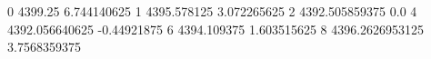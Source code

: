 0 4399.25 6.744140625
1 4395.578125 3.072265625
2 4392.505859375 0.0
4 4392.056640625 -0.44921875
6 4394.109375 1.603515625
8 4396.2626953125 3.7568359375
